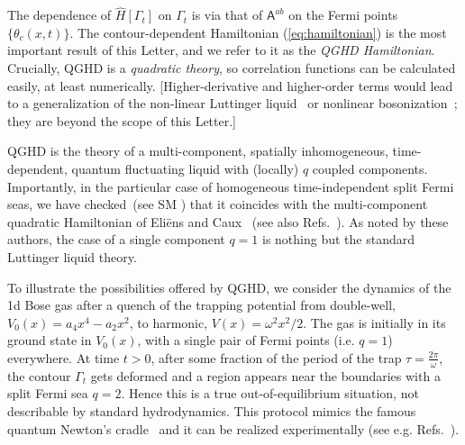 \documentclass[twocolumn,amsfonts,showpacs,superscriptaddress]{revtex4-1}
\begin{document}
The dependence of $\hat H[\Gamma_t]$ on $\Gamma_t$ is via that of $\mathsf A^{ab}$ on the Fermi points $\{\theta_c(x,t)\}$. The contour-dependent Hamiltonian (\ref{eq:hamiltonian}) is the most important result of this Letter, and we refer to it as the {\it QGHD Hamiltonian}. Crucially, QGHD is a {\it quadratic theory}, so correlation functions can be calculated easily, at least numerically. [Higher-derivative and higher-order terms would lead to a generalization of the non-linear Luttinger liquid~\cite{imambekov2012one,imambekov2009universal} or nonlinear bosonization~\cite{abanov2005quantum,bettelheim2008quantum,stone2008classical,kulkarni2009nonlinear}; they are beyond the scope of this Letter.]

QGHD is the theory of a multi-component, spatially inhomogeneous, time-dependent, quantum fluctuating liquid with (locally) $q$ coupled components. Importantly, in the particular case of homogeneous time-independent split Fermi seas, we have checked~(see SM \cite{SM}) that it coincides with the multi-component quadratic Hamiltonian of Eli\"ens and Caux~\cite{eliens2016general,eliens2017quantum} (see also Refs.~\cite{fokkema2014split,vlijm2016correlations}). As noted by these authors, the case of a single component $q=1$ is nothing but the standard Luttinger liquid theory.



\vspace{0.1cm}
\; To illustrate the possibilities offered by QGHD, we consider the dynamics of the 1d Bose gas after a quench of the trapping potential from double-well, $V_0(x)= a_4 x^4 - a_2 x^2$, to harmonic, $V(x) = \omega^2 x^2/2$. The gas is initially in its ground state in $V_0(x)$, with a single pair of Fermi points (i.e. $q=1$) everywhere. At time $t>0$, after some fraction of the period of the trap $\tau = \frac{2\pi}{\omega}$, the contour $\Gamma_t$ gets deformed and a region appears near the boundaries with a split Fermi sea $q=2$. Hence this is a true out-of-equilibrium situation, not describable by standard hydrodynamics. This protocol mimics the famous quantum Newton's cradle~\cite{kinoshita2006quantum} and it can be realized experimentally (see e.g. Refs.~\cite{schemmer2019generalized,joseph2011observation}).
\end{document}
